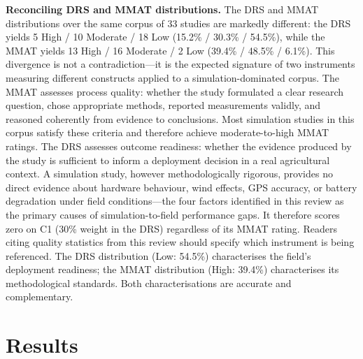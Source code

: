 \documentclass[review,3p,times]{elsarticle}
\begin{document}
\textbf{Reconciling DRS and MMAT distributions.} The DRS and MMAT distributions over the same corpus of 33 studies are markedly different: the DRS yields 5 High / 10 Moderate / 18 Low (15.2\% / 30.3\% / 54.5\%), while the MMAT yields 13 High / 16 Moderate / 2 Low (39.4\% / 48.5\% / 6.1\%). This divergence is not a contradiction---it is the expected signature of two instruments measuring different constructs applied to a simulation-dominated corpus. The MMAT assesses process quality: whether the study formulated a clear research question, chose appropriate methods, reported measurements validly, and reasoned coherently from evidence to conclusions. Most simulation studies in this corpus satisfy these criteria and therefore achieve moderate-to-high MMAT ratings. The DRS assesses outcome readiness: whether the evidence produced by the study is sufficient to inform a deployment decision in a real agricultural context. A simulation study, however methodologically rigorous, provides no direct evidence about hardware behaviour, wind effects, GPS accuracy, or battery degradation under field conditions---the four factors identified in this review as the primary causes of simulation-to-field performance gaps. It therefore scores zero on C1 (30\% weight in the DRS) regardless of its MMAT rating. Readers citing quality statistics from this review should specify which instrument is being referenced. The DRS distribution (Low: 54.5\%) characterises the field's deployment readiness; the MMAT distribution (High: 39.4\%) characterises its methodological standards. Both characterisations are accurate and complementary.

\section{Results}
\end{document}
